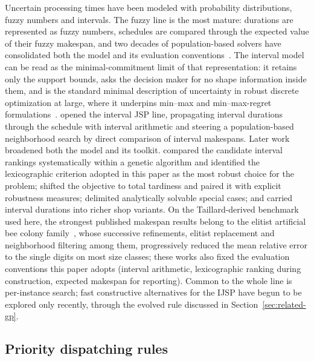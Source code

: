 \documentclass[preprint,12pt]{elsarticle}
\theoremstyle{definition}
\theoremstyle{remark}
\begin{document}
Uncertain processing times have been modeled with probability
distributions, fuzzy numbers and intervals. The fuzzy line is the most
mature: durations are represented as fuzzy numbers, schedules are
compared through the expected value of their fuzzy makespan, and two
decades of population-based solvers have consolidated both the model
and its evaluation
conventions~\citep{GonzalezRodriguez2010,Abdullah2014,Palacios2015}.
The interval model can be read as the minimal-commitment limit of
that representation: it retains only the support bounds, asks the
decision maker for no shape information inside them, and is the
standard minimal description of uncertainty in robust discrete
optimization at large, where it underpins min--max and
min--max-regret formulations~\citep{Kouvelis1997,Kasperski2016}.
\citet{Lei2011} opened the interval JSP line, propagating interval
durations through the schedule with interval arithmetic and steering
a population-based neighborhood search by direct comparison of
interval makespans. Later work broadened both the model and its
toolkit. \citet{DiazGA2020} compared the candidate interval rankings
systematically within a genetic algorithm and identified the
lexicographic criterion adopted in this paper as the most robust
choice for the problem; \citet{DiazTardiness2022} shifted the
objective to total tardiness and paired it with explicit robustness
measures; \citet{Sotskov2020} delimited analytically solvable special
cases; and \citet{Zheng2024} carried interval durations into richer
shop variants. On the Taillard-derived benchmark used here, the
strongest published makespan results belong to the elitist artificial
bee colony family~\citep{DiazICAE2023,DiazFEABC2023}, whose
successive refinements, elitist replacement and neighborhood
filtering among them, progressively reduced the mean relative error
to the single digits on most size classes; these works also
fixed the evaluation conventions this paper adopts (interval
arithmetic, lexicographic ranking during construction, expected
makespan for reporting). Common to the whole line is per-instance
search; fast constructive alternatives for the IJSP have begun to be
explored only recently, through the evolved rule discussed in
Section~\ref{sec:related-gp}.

\subsection{Priority dispatching rules}
\label{sec:related-rules}
\end{document}
